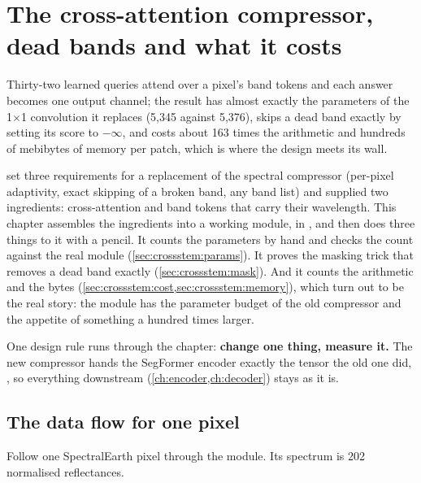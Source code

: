 \chapter{The cross-attention compressor, dead bands and what it costs}\label{ch:crossstem}

\begin{onething}
Thirty-two learned queries attend over a pixel's band tokens and each answer becomes one output channel; the result has almost exactly the parameters of the 1$\times$1 convolution it replaces (5,345 against 5,376), skips a dead band exactly by setting its score to $-\infty$, and costs about 163 times the arithmetic and hundreds of mebibytes of memory per patch, which is where the design meets its wall.
\end{onething}

 set three requirements for a replacement of the spectral compressor (per-pixel adaptivity, exact skipping of a broken band, any band list) and supplied two ingredients: cross-attention and band tokens that carry their wavelength. This chapter assembles the ingredients into a working module,  in , and then does three things to it with a pencil. It counts the parameters by hand and checks the count against the real module (\cref{sec:crossstem:params}). It proves the masking trick that removes a dead band exactly (\cref{sec:crossstem:mask}). And it counts the arithmetic and the bytes (\cref{sec:crossstem:cost,sec:crossstem:memory}), which turn out to be the real story: the module has the parameter budget of the old compressor and the appetite of something a hundred times larger.

One design rule runs through the chapter: \textbf{change one thing, measure it.} The new compressor hands the SegFormer encoder exactly the tensor the old one did, , so everything downstream (\cref{ch:encoder,ch:decoder}) stays as it is.

\section{The data flow for one pixel}\label{sec:crossstem:flow}

Follow one SpectralEarth pixel through the module. Its spectrum is 202 normalised reflectances.

